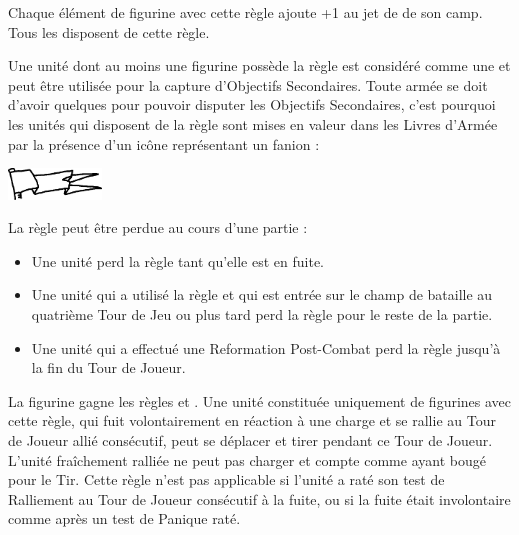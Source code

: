 \label{channel_special_rule}

Chaque élément de figurine avec cette règle ajoute +1 au jet de \channel{} de son camp. Tous les \wizards{} disposent de cette règle.


Une unité dont au moins une figurine possède la règle \scoring{} est considéré comme une \scoringunit{} et peut être utilisée pour la capture d'Objectifs Secondaires. Toute armée se doit d'avoir quelques \scoringunits{} pour pouvoir disputer les Objectifs Secondaires, c'est pourquoi les unités qui disposent de la règle \scoring{} sont mises en valeur dans les Livres d'Armée par la présence d'un icône représentant un fanion :

\begin{center}
\includegraphics[width=2.5cm]{../Layout/pics/logo_scoring.png}
\end{center}

La règle \scoring{} peut être perdue au cours d'une partie :
\begin{itemize}[label={-}]
\item Une unité perd la règle \scoring{} tant qu'elle est en fuite.
\item Une unité qui a utilisé la règle \ambush{} et qui est entrée sur le champ de bataille au quatrième Tour de Jeu ou plus tard perd la règle \scoring{} pour le reste de la partie.
\item Une unité qui a effectué une Reformation Post-Combat perd la règle \scoring{} jusqu'à la fin du Tour de Joueur.
\end{itemize}


La figurine gagne les règles \vanguard{} et \lighttroops{}. Une unité constituée uniquement de figurines avec cette règle, qui fuit volontairement en réaction à une charge et se rallie au Tour de Joueur allié consécutif, peut se déplacer et tirer pendant ce Tour de Joueur. L'unité fraîchement ralliée ne peut pas charger et compte comme ayant bougé pour le Tir. Cette règle n'est pas applicable si l'unité a raté son test de Ralliement au Tour de Joueur consécutif à la fuite, ou si la fuite était involontaire comme après un test de Panique raté.


